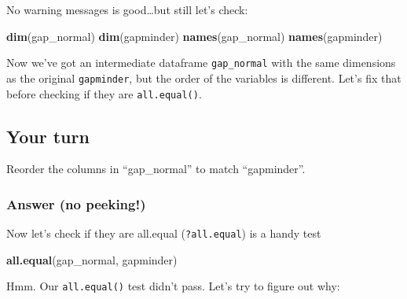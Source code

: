 \documentclass[]{book}
\newenvironment{Shaded}{\begin{snugshade}}{\end{snugshade}}
\newcommand{\KeywordTok}[1]{\textcolor[rgb]{0.13,0.29,0.53}{\textbf{#1}}}
\newcommand{\StringTok}[1]{\textcolor[rgb]{0.31,0.60,0.02}{#1}}
\newcommand{\CommentTok}[1]{\textcolor[rgb]{0.56,0.35,0.01}{\textit{#1}}}
\newcommand{\OperatorTok}[1]{\textcolor[rgb]{0.81,0.36,0.00}{\textbf{#1}}}
\newcommand{\NormalTok}[1]{#1}
\theoremstyle{definition}
\theoremstyle{definition}
\theoremstyle{definition}
\theoremstyle{remark}
\begin{document}
No warning messages is good\ldots{}but still let's check:

\begin{Shaded}
\begin{Highlighting}[]
\KeywordTok{dim}\NormalTok{(gap_normal)}
\KeywordTok{dim}\NormalTok{(gapminder)}
\KeywordTok{names}\NormalTok{(gap_normal)}
\KeywordTok{names}\NormalTok{(gapminder)}
\end{Highlighting}
\end{Shaded}

Now we've got an intermediate dataframe \texttt{gap\_normal} with the
same dimensions as the original \texttt{gapminder}, but the order of the
variables is different. Let's fix that before checking if they are
\texttt{all.equal()}.

\subsection{Your turn}\label{your-turn-10}

Reorder the columns in ``gap\_normal'' to match ``gapminder''.

\subsubsection{Answer (no peeking!)}\label{answer-no-peeking-1}

\begin{Shaded}
\end{Shaded}

Now let's check if they are all.equal (\texttt{?all.equal}) is a handy
test

\begin{Shaded}
\begin{Highlighting}[]
\KeywordTok{all.equal}\NormalTok{(gap_normal, gapminder)}
\end{Highlighting}
\end{Shaded}

Hmm. Our \texttt{all.equal()} test didn't pass. Let's try to figure out
why:
\end{document}
